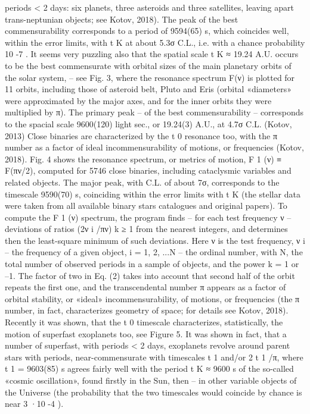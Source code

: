 periods < 2 days: six planets, three asteroids and three satellites, leaving apart trans-neptunian
objects; see Kotov, 2018). The peak of the best commensurability corresponds to a period of
9594(65) s, which coincides well, within the error limits, with t K at about 5.3σ C.L., i.e. with a
chance probability 10 -7 .
It seems very puzzling also that the spatial scale t K ≈ 19.24 A.U. occurs to be the best
commensurate with orbital sizes of the main planetary orbits of the solar system, – see Fig. 3,
where the resonance spectrum F(ν) is plotted for 11 orbits, including those of asteroid belt, Pluto
and Eris (orbital «diameters» were approximated by the major axes, and for the inner orbits they
were multiplied by π). The primary peak – of the best commensurability – corresponds to the
spacial scale 9600(120) light sec., or 19.24(3) A.U., at 4.7σ C.L. (Kotov, 2013)
Close binaries are characterized by the t 0 resonance too, with the π number as a factor of ideal
incommensurability of motions, or frequencies (Kotov, 2018). Fig. 4 shows the resonance spectrum,
or metrics of motion, F 1 (ν) ≡ F(πν/2), computed for 5746 close binaries, including cataclysmic
variables and related objects. The major peak, with C.L. of about 7σ, corresponds to the timescale
9590(70) s, coinciding within the error limits with t K (the stellar data were taken from all available
binary stars catalogues and original papers).
To compute the F 1 (ν) spectrum, the program finds – for each test frequency ν – deviations of
ratios (2ν i /πν) k ≥ 1 from the nearest integers, and determines then the least-square minimum of such
deviations. Here ν is the test frequency, ν i – the frequency of a given object, i = 1, 2, ...N – the
ordinal number, with N, the total number of observed periods in a sample of objects, and the power
k = 1 or –1. The factor of two in Eq. (2) takes into account that second half of the orbit repeats the
first one, and the transcendental number π appears as a factor of orbital stability, or «ideal»
incommensurability, of motions, or frequencies (the π number, in fact, characterizes geometry of
space; for details see Kotov, 2018).
Recently it was shown, that the t 0 timescale characterizes, statistically, the motion of superfast
exoplanets too, see Figure 5.
It was shown in fact, that a number of superfast, with periods < 2 days, exoplanets revolve
around parent stars with periods, near-commensurate with timescales t 1 and/or 2 t 1 /π, where t 1 =
9603(85) s agrees fairly well with the period t K ≈ 9600 s of the so-called «cosmic oscillation», found
firstly in the Sun, then – in other variable objects of the Universe (the probability that the two
timescales would coincide by chance is near 3 ·10 -4 ).

